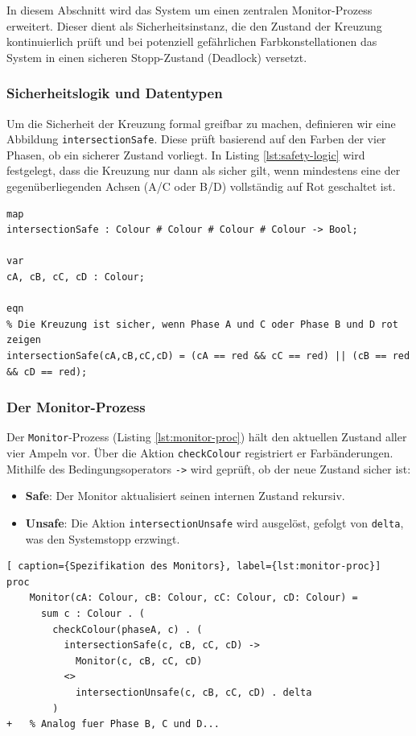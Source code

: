 \documentclass{article}
\begin{document}
In diesem Abschnitt wird das System um einen zentralen Monitor-Prozess erweitert. Dieser dient als Sicherheitsinstanz, die den Zustand der Kreuzung kontinuierlich prüft und bei potenziell gefährlichen Farbkonstellationen das System in einen sicheren Stopp-Zustand (Deadlock) versetzt.

\subsubsection{Sicherheitslogik und Datentypen}
Um die Sicherheit der Kreuzung formal greifbar zu machen, definieren wir eine Abbildung \texttt{intersectionSafe}. 
Diese prüft basierend auf den Farben der vier Phasen, ob ein sicherer Zustand vorliegt. 
In Listing \ref{lst:safety-logic} wird festgelegt, dass die Kreuzung nur dann als sicher gilt, wenn mindestens eine der gegenüberliegenden Achsen (A/C oder B/D) vollständig auf Rot geschaltet ist.

\begin{lstlisting}[caption={Definition der Sicherheitslogik},label={lst:safety-logic}]
map
intersectionSafe : Colour # Colour # Colour # Colour -> Bool;

var
cA, cB, cC, cD : Colour;

eqn
% Die Kreuzung ist sicher, wenn Phase A und C oder Phase B und D rot zeigen
intersectionSafe(cA,cB,cC,cD) = (cA == red && cC == red) || (cB == red && cD == red);
\end{lstlisting}

\subsubsection{Der Monitor-Prozess}
Der \texttt{Monitor}-Prozess (Listing \ref{lst:monitor-proc}) hält den aktuellen Zustand aller vier Ampeln vor. Über die Aktion \texttt{checkColour} registriert er Farbänderungen. Mithilfe des Bedingungsoperators \texttt{->} wird geprüft, ob der neue Zustand sicher ist:
\begin{itemize}
\item \textbf{Safe}: Der Monitor aktualisiert seinen internen Zustand rekursiv.
\item \textbf{Unsafe}: Die Aktion \texttt{intersectionUnsafe} wird ausgelöst, gefolgt von \texttt{delta}, was den Systemstopp erzwingt.
\end{itemize}

\begin{lstlisting}[ caption={Spezifikation des Monitors}, label={lst:monitor-proc}]
proc
	Monitor(cA: Colour, cB: Colour, cC: Colour, cD: Colour) =
	  sum c : Colour . (
		checkColour(phaseA, c) . (
		  intersectionSafe(c, cB, cC, cD) -> 
		    Monitor(c, cB, cC, cD)
		  <> 
			intersectionUnsafe(c, cB, cC, cD) . delta
        )
+   % Analog fuer Phase B, C und D...
\end{lstlisting}
\end{document}
